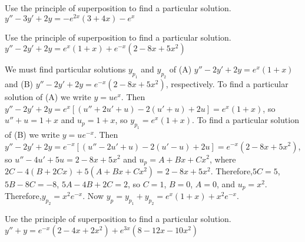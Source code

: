 \documentclass{ximera}
\begin{document}
\begin{problem}\label{exer:5.4.27} Use
the principle of superposition to find a particular solution. $y''-3y'+2y=-e^{2x}(3+4x)-e^x$
\end{problem}

\begin{problem}\label{exer:5.4.28} Use
the principle of superposition to find a particular solution. $y''-2y'+2y=e^x(1+x)+e^{-x}(2-8x+5x^2)$
\begin{solution}
We must find particular solutions $y_{p_1}$ and $y_{p_2}$ of (A)
$y''-2y'+2y=e^x(1+x)$ and (B) $y''-2y'+2y=e^{-x}(2-8x+5x^2)$,
respectively. To find a particular solution of (A) we write $y=ue^x$.
Then $y''-2y'+2y=e^x\left[(u''+2u'+u)-2(u'+u)+2u\right]= e^x(1+x)$, so
$u''+u=1+x$ and $u_p=1+x$, so $y_{p_1}=e^x(1+x)$. To find a particular
solution of (B) we write $y=ue^{-x}$. Then
$y''-2y'+2y=e^{-x}\left[(u''-2u'+u)-2(u'-u)+2u\right]=
e^{-x}(2-8x+5x^2)$, so $u''-4u'+5u =2-8x+5x^2$ and $u_p=A+Bx+Cx^2$,
where $2C-4(B+2Cx)+5(A+Bx+Cx^2)=2-8x+5x^2$. Therefore,$5C=5$,
$5B-8C=-8$, $5A-4B+2C=2$, so $C=1$, $B=0$, $A=0$, and $u_p=x^2$.
Therefore,$y_{p_2}=x^2e^{-x}$. Now
$y_p=y_{p_1}+y_{p_2}=e^x(1+x)+x^2e^{-x}$.
\end{solution}
\end{problem}

\begin{problem}\label{exer:5.4.29} Use
the principle of superposition to find a particular solution.
$y''+y=e^{-x}(2-4x+2x^2)+e^{3x}(8-12x-10x^2)$
\end{problem}
\end{document}
